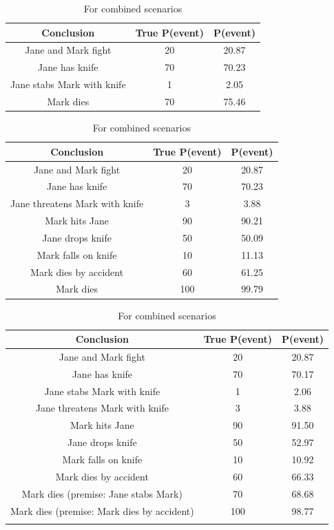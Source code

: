 \begin{enumerate}
\begin{table}
\begin{center}
\begin{tabular}{|c|c|c|}
 \hline
 Conclusion & True P(event) & P(event) \\
 \hline
 Jane and Mark fight   & 20 &  20.87   \\
 Jane has knife & 70 & 70.23 \\
 Jane stabs Mark with knife & 1 & 2.05 \\
 Mark dies & 70 & 75.46 \\ 
\hline
\end{tabular}
\caption{For only scenario 1.}

\begin{tabular}{|c|c|c|}
 \hline
 Conclusion & True P(event) & P(event)\\
 \hline
 Jane and Mark fight   & 20 &  20.87   \\
 Jane has knife & 70 & 70.23 \\
 Jane threatens Mark with knife & 3 & 3.88 \\
 Mark hits Jane & 90 & 90.21 \\
 Jane drops knife & 50 & 50.09 \\
 Mark falls on knife & 10 & 11.13\\
 Mark dies by accident & 60 & 61.25 \\
 Mark dies & 100 & 99.79 \\ 
\hline
\end{tabular}
\caption{For only scenario 2}

\begin{tabular}{|c|c|c|}
 \hline
 Conclusion & True P(event) & P(event)\\
 \hline
 Jane and Mark fight   & 20 &  20.87   \\
 Jane has knife & 70 & 70.17 \\
 Jane stabs Mark with knife & 1 & 2.06 \\
 Jane threatens Mark with knife & 3 & 3.88 \\
 Mark hits Jane & 90 & 91.50 \\
 Jane drops knife & 50 & 52.97 \\
 Mark falls on knife & 10 & 10.92\\
 Mark dies by accident & 60 & 66.33 \\
 Mark dies (premise: Jane stabs Mark) & 70 & 68.68 \\ 
  Mark dies (premise: Mark dies by accident)& 100 & 98.77 \\ 
\hline
\label{test}
\end{tabular}
\caption{For combined scenarios}
\end{center}
\end{table}




\end{enumerate}
